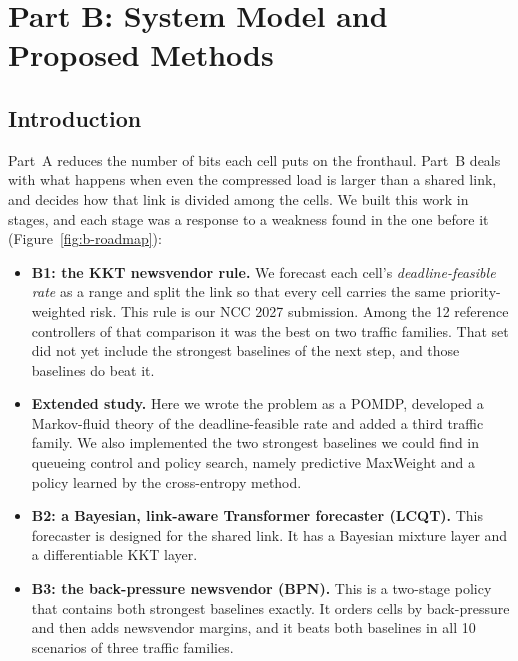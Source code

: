 \chapter{Part B: System Model and Proposed Methods}
\label{ch:partb-methods}
\thispagestyle{plain}

\section{Introduction}

Part~A reduces the number of bits each cell puts on the fronthaul. Part~B deals with what happens when even the compressed load is larger than a shared link, and decides how that link is divided among the cells. We built this work in stages, and each stage was a response to a weakness found in the one before it (Figure~\ref{fig:b-roadmap}):
\begin{itemize}
  \item \textbf{B1: the KKT newsvendor rule.} We forecast each cell's \emph{deadline-feasible rate} as a range and split the link so that every cell carries the same priority-weighted risk. This rule is our NCC 2027 submission. Among the 12 reference controllers of that comparison it was the best on two traffic families. That set did not yet include the strongest baselines of the next step, and those baselines do beat it.
  \item \textbf{Extended study.} Here we wrote the problem as a POMDP, developed a Markov-fluid theory of the deadline-feasible rate and added a third traffic family. We also implemented the two strongest baselines we could find in queueing control and policy search, namely predictive MaxWeight and a policy learned by the cross-entropy method.
  \item \textbf{B2: a Bayesian, link-aware Transformer forecaster (LCQT).} This forecaster is designed for the shared link. It has a Bayesian mixture layer and a differentiable KKT layer.
  \item \textbf{B3: the back-pressure newsvendor (BPN).} This is a two-stage policy that contains both strongest baselines exactly. It orders cells by back-pressure and then adds newsvendor margins, and it beats both baselines in all 10 scenarios of three traffic families.
\end{itemize}

